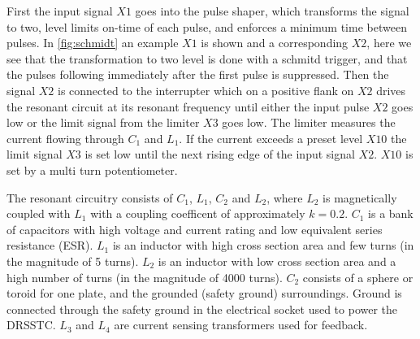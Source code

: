 First the input signal $X1$ goes into the pulse shaper, which transforms the signal to two, level limits on-time of each pulse, and enforces a minimum time between pulses. In \cref{fig:schmidt} an example $X1$ is shown and a corresponding $X2$, here we see that the transformation to two level is done with a schmitd trigger, and that the pulses following immediately after the first pulse is suppressed. Then the signal $X2$ is connected to the interrupter which on a positive flank on $X2$ drives the resonant circuit at its resonant frequency until either the input pulse $X2$ goes low or the limit signal from the limiter $X3$ goes low.
The limiter measures the current flowing through $C_1$ and $L_1$. If the current exceeds a preset level $X10$ the limit signal $X3$ is set low until the next rising edge of the input signal $X2$. $X10$ is set by a multi turn potentiometer.

The resonant circuitry consists of $C_1$, $L_1$, $C_2$ and $L_2$, where $L_2$ is magnetically coupled with $L_1$ with a coupling coefficent of approximately $k=0.2$. $C_1$ is a bank of capacitors with high voltage and current rating and low equivalent series resistance (ESR). $L_1$ is an inductor with high cross section area and few turns (in the magnitude of 5 turns). $L_2$ is an inductor with low cross section area and a high number of turns (in the magnitude of 4000 turns). $C_2$ consists of a sphere or toroid for one plate, and the grounded (safety ground) surroundings. Ground is connected through the safety ground in the electrical socket used to power the DRSSTC. $L_3$ and $L_4$ are current sensing transformers used for feedback.


